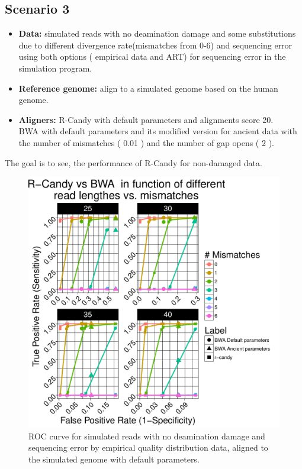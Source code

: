 \documentclass[11pt,a4paper]{report}
\begin{document}

\subsection{Scenario 3}
 
  \begin{itemize}

   \item \textbf{Data:} simulated reads with no deamination damage
and some substitutions due to different divergence rate(mismatches 
from 0-6) and sequencing error using both options ( empirical data 
and ART) for sequencing error in the simulation program.
   
   \item \textbf{Reference genome:} align to a simulated genome based
 on the human genome.

    \item \textbf{Aligners:} 
R-Candy with default parameters and alignments score 20. \\
BWA with default parameters and its modified version for ancient
data with the number of mismatches ( 0.01 ) and the number of gap opens ( 2 ).

  \end{itemize}
 
The goal is to see, the performance of R-Candy for non-damaged data.

\begin{figure}[H]
\centering
\includegraphics[width=12cm]{pictures/bROC_DS3_emp.pdf}
\caption{ROC curve for simulated reads with no deamination damage and sequencing error by empirical quality distribution data, aligned to the simulated genome
         with default parameters.}
\label{DS3_emp}
\end{figure}
\end{document}
